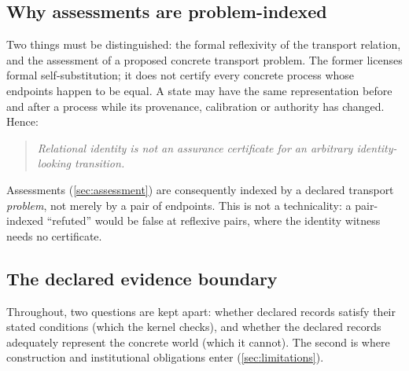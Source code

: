 \subsection{Why assessments are problem-indexed}
Two things must be distinguished: the formal reflexivity of the transport relation, and the assessment of a proposed concrete transport problem. The former licenses formal self-substitution; it does not certify every concrete process whose endpoints happen to be equal. A state may have the same representation before and after a process while its provenance, calibration or authority has changed. Hence:
\begin{quote}
\emph{Relational identity is not an assurance certificate for an arbitrary identity-looking transition.}
\end{quote}
Assessments (\cref{sec:assessment}) are consequently indexed by a declared transport \emph{problem}, not merely by a pair of endpoints. This is not a technicality: a pair-indexed ``refuted'' would be false at reflexive pairs, where the identity witness needs no certificate.

\subsection{The declared evidence boundary}
Throughout, two questions are kept apart: whether declared records satisfy their stated conditions (which the kernel checks), and whether the declared records adequately represent the concrete world (which it cannot). The second is where construction and institutional obligations enter (\cref{sec:limitations}).
